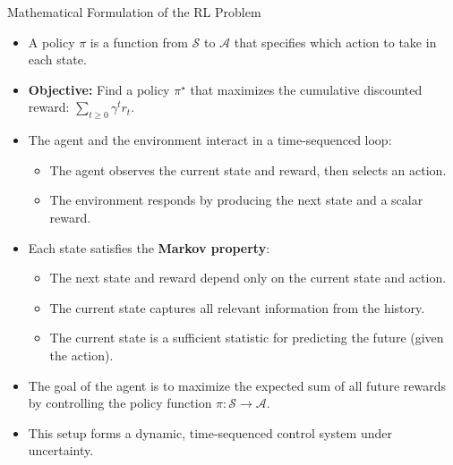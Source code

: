 \begin{frame}[allowframebreaks]{Mathematical Formulation of the RL Problem}
\begin{itemize}
\begin{itemize}
            \item The environment samples the next state $s_{t+1} \sim p(\cdot|s_t, a_t)$.
            \item The agent receives reward $r_t$ and next state $s_{t+1}$.
        \end{itemize}
        \item A policy $\pi$ is a function from $\mathcal{S}$ to $\mathcal{A}$ that specifies which action to take in each state.
        \item \textbf{Objective:} Find a policy $\pi^\star$ that maximizes the cumulative discounted reward: $\sum_{t \geq 0} \gamma^t r_t$.
    \end{itemize}
\framebreak
    \begin{itemize}
        \item The agent and the environment interact in a time-sequenced loop:
        \begin{itemize}
            \item The agent observes the current state and reward, then selects an action.
            \item The environment responds by producing the next state and a scalar reward.
        \end{itemize}
        \item Each state satisfies the \textbf{Markov property}:
        \begin{itemize}
            \item The next state and reward depend only on the current state and action.
            \item The current state captures all relevant information from the history.
            \item The current state is a sufficient statistic for predicting the future (given the action).
        \end{itemize}
        \item The goal of the agent is to maximize the expected sum of all future rewards by controlling the policy function $\pi: \mathcal{S} \rightarrow \mathcal{A}$.
        \item This setup forms a dynamic, time-sequenced control system under uncertainty.
\end{itemize}
\end{frame}

